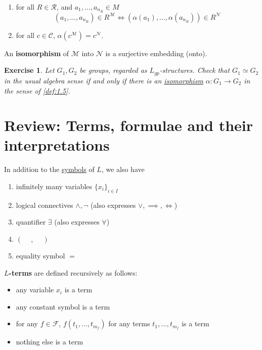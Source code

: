 \documentclass{article}
\newtheorem{nexercise}[nthm]{Exercise}
\begin{document}
\begin{ndef}[Embedding]
\begin{enumerate}[label=(\roman*)]
\begin{center}
      \end{center}
    \item for all $R \in \mathscr{R}$, and $a_1, \dotsc, a_{n_R} \in M$
      \begin{equation*}
        (a_1, \dotsc, a_{n_R}) \in R^\mathcal{M} \iff (\alpha(a_1), \dotsc, \alpha(a_{n_R})) \in R^\mathcal{N}
      \end{equation*}
    \item for all $c \in \mathscr{C}$, $\alpha(c^\mathcal{M}) = c^\mathcal{N}$.
  \end{enumerate}
  An \textbf{isomorphism} of $\mathcal{M}$ into $\mathcal{N}$ is a surjective embedding (onto).
\end{ndef}

\begin{nexercise}\label{ex:1.6}
  Let $G_1, G_2$ be groups, regarded as \hyperlink{def:lgp}{$L_{gp}$}-structures.
  Check that $G_1 \simeq G_2$ in the usual algebra sense if and only if there is an \hyperlink{def:embedding}{isomorphism} $\alpha: G_1 \to G_2$ in the sense of \cref{def:1.5}.
\end{nexercise}

\clearpage
\section{Review: Terms, formulae and their interpretations}
In addition to the \hyperlink{def:lang}{symbols} of $L$, we also have
\begin{enumerate}[label=(\roman*)]
  \item infinitely many variables $\{x_i\}_{i \in I}$
  \item logical connectives $\wedge, \neg$ (also expresses $\vee, \implies, \iff$)
    \item quantifier $\exists$ (also expresses $\forall$)
    \item $(\phantom{-},\phantom{-})$
    \item equality symbol $=$
\end{enumerate}

\begin{ndef}\label{def:2.1}
  \textbf{$L$-terms} are defined recursively as follows:
  \begin{itemize}[label=--]
    \item any variable $x_i$ is a term
    \item any constant symbol is a term
    \item for any $f \in \mathscr{F}$, $f(t_1, \dotsc, t_{m_f})$ for any terms $t_1, \dotsc, t_{m_f}$ is a term
    \item nothing else is a term
  \end{itemize}
\end{ndef}
\end{document}
